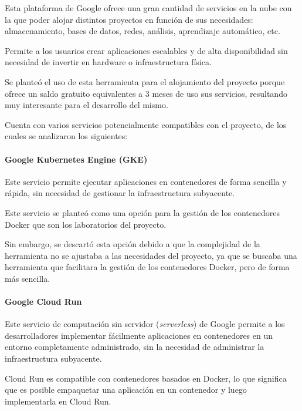                 Esta plataforma de Google ofrece una gran cantidad de servicios en la nube con la que poder alojar distintos proyectos en función de sus necesidades: almacenamiento, bases de datos, redes, análisis, aprendizaje automático, etc.
                
                Permite a los usuarios crear aplicaciones escalables y de alta disponibilidad sin necesidad de invertir en hardware o infraestructura física.

                Se planteó el uso de esta herramienta para el alojamiento del proyecto porque ofrece un saldo gratuito equivalentes a 3 meses de uso sus servicios, resultando muy interesante para el desarrollo del mismo.

                Cuenta con varios servicios potencialmente compatibles con el proyecto, de los cuales se analizaron los siguientes:

                \paragraph{Google Kubernetes Engine (GKE)}

                    Este servicio permite ejecutar aplicaciones en contenedores de forma sencilla y rápida, sin necesidad de gestionar la infraestructura subyacente.

                    Este servicio se planteó como una opción para la gestión de los contenedores Docker que son los laboratorios del proyecto.

                    Sin embargo, se descartó esta opción debido a que la complejidad de la herramienta no se ajustaba a las necesidades del proyecto, ya que se buscaba una herramienta que facilitara la gestión de los contenedores Docker, pero de forma más sencilla.

                    \newpage

                \paragraph{Google Cloud Run}

                    Este servicio de computación sin servidor (\textit{serverless}) de Google permite a los desarrolladores implementar fácilmente aplicaciones en contenedores en un entorno completamente administrado, sin la necesidad de administrar la infraestructura subyacente.
                    
                    Cloud Run es compatible con contenedores basados en Docker, lo que significa que es posible empaquetar una aplicación en un contenedor y luego implementarla en Cloud Run.

